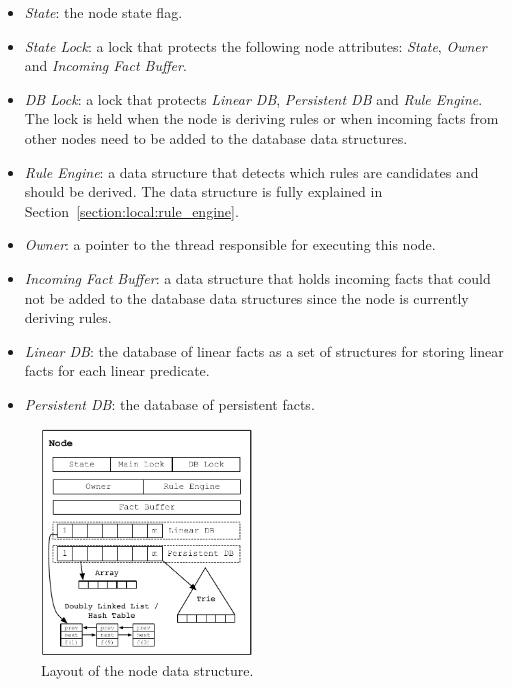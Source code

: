 \begin{itemize}
   \item \emph{State}: the node state flag.
   \item \emph{State Lock}: a lock that protects the following node attributes:
      \emph{State}, \emph{Owner} and \emph{Incoming Fact Buffer}.
   \item \emph{DB Lock}: a lock that protects \emph{Linear DB},
      \emph{Persistent DB} and \emph{Rule Engine}. The lock is held when the node is deriving rules or
      when incoming facts from other nodes need to be added to the database data
      structures.
   \item \emph{Rule Engine}: a data structure that detects which rules are
      candidates and should be derived. The data structure is fully explained
      in Section~\ref{section:local:rule_engine}.
   \item \emph{Owner}: a pointer to the thread responsible for executing this
      node.
   \item \emph{Incoming Fact Buffer}: a data structure that holds incoming facts that
      could not be added to the database data structures since the node is
      currently deriving rules.
   \item \emph{Linear DB}: the database of linear facts as a set of
      structures for storing linear facts for each linear predicate.
   \item \emph{Persistent DB}: the database of persistent facts.
\end{itemize}

\begin{figure}[t]
\centering
\includegraphics[width=0.5\textwidth]{figures/local/node.pdf}
\caption{Layout of the node data structure.}
\label{fig:local:node_overview}
\end{figure}

